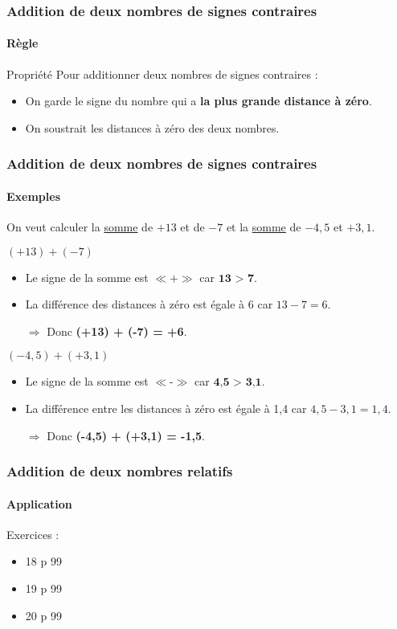 \documentclass{beamer}
\begin{document}
\begin{frame}
	\frametitle{Addition de deux nombres de signes contraires}  
	\framesubtitle{Règle}	
	
	\begin{block}{Propriété}
		Pour additionner deux nombres de signes contraires :
		\begin{itemize}
			\item On garde le signe du nombre qui a \textbf{la plus grande distance à zéro}. 
			\item On soustrait les distances à zéro des deux nombres. 
		\end{itemize}
	\end{block}	
	
\end{frame}

\begin{frame}
	\frametitle{Addition de deux nombres de signes contraires}  
	\framesubtitle{Exemples}	
	
	On veut calculer la \underline{somme} de $ +13 $ et de $ -7 $ et la \underline{somme} de $ -4,5 $ et $ +3,1 $.\pause
	
	\begin{exampleblock}{$ (+13) + (-7) $}
		\begin{itemize} %
			\item Le signe de la somme est $ \ll \textbf{+} \gg $ car $\textbf{13 > 7}$. %
			\item La différence des distances à zéro est égale à 6 
			car $ 13 - 7 = 6 $. %
			\item[$\Rightarrow$] Donc \textbf{(+13) + (-7) = +6}.\pause
		\end{itemize}
	\end{exampleblock}
	
	\begin{exampleblock}{$ (-4,5) + (+3,1) $}
		\begin{itemize}
			\item Le signe de la somme est $ \ll \textbf{-} \gg $ car $\textbf{4,5 > 3,1}$.
			\item La différence entre les distances à zéro est égale à 1,4 
			car $ 4,5 - 3,1 = 1,4 $.
			\item[$\Rightarrow$] Donc \textbf{(-4,5) + (+3,1) = -1,5}.
		\end{itemize}
	\end{exampleblock}
\end{frame}


\begin{frame}
	\frametitle{Addition de deux nombres relatifs}  
	\framesubtitle{Application}	
	
	Exercices :
	\begin{itemize}
		\item 18 p 99
		\item 19 p 99
		\item 20 p 99
	\end{itemize}
\end{frame}
\end{document}
